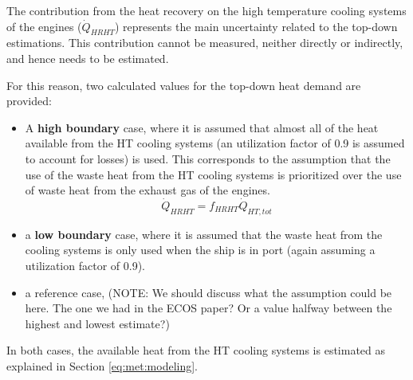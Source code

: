 \documentclass[preprint,12pt]{elsarticle}
\begin{document}
The contribution from the heat recovery on the high temperature cooling systems of the engines ($\dot{Q}_{HRHT}$) represents the main uncertainty related to the top-down estimations. This contribution cannot be measured, neither directly or indirectly, and hence needs to be estimated. 

For this reason, two calculated values for the top-down heat demand are provided:
\begin{itemize}
	\item A \textbf{high boundary} case, where it is assumed that almost all of the heat available from the HT cooling systems (an utilization factor of 0.9 is assumed to account for losses) is used. This corresponds to the assumption that the use of the waste heat from the HT cooling systems is prioritized over the use of waste heat from the exhaust gas of the engines.
	\begin{equation}
	\dot{Q}_{HRHT} = f_{HRHT} \dot{Q}_{HT,tot} 
	\end{equation}
	\item a \textbf{low boundary} case, where it is assumed that the waste heat from the cooling systems is only used when the ship is in port (again assuming a utilization factor of 0.9). 
	\item a reference case, (NOTE: We should discuss what the assumption could be here. The one we had in the ECOS paper? Or a value halfway between the highest and lowest estimate?)
\end{itemize}

In both cases, the available heat from the HT cooling systems is estimated as explained in Section \ref{eq:met:modeling}.
\end{document}

